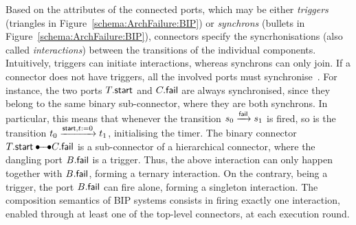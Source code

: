 \documentclass[smallcondensed]{svjour3}
\newcommand{\mdash}{---}
\newcommand{\goesto}[2][]{\ensuremath{\xrightarrow[#1]{#2}}}
\begin{document}
Based on the
attributes of the connected ports, which may be
either \emph{triggers} (triangles in Figure~\ref{schema:ArchFailure:BIP})
or \emph{synchrons} (bullets in Figure~\ref{schema:ArchFailure:BIP}),
%
connectors specify the syncrhonisations (also called
\emph{interactions}) between the transitions of the individual
components.  Intuitively, triggers can initiate interactions, whereas
synchrons can only join.  If a connector does not have triggers, all
the involved ports must synchronise~\cite{BliSif08-acp-tc}.
%
For instance, the two ports $T.\mathsf{start}$ and
$C.\mathsf{fail}$ are always synchronised, since they belong to
the same binary sub-connector, where they are both synchrons.  In
particular, this means that whenever the transition 
$\cstate{0} \goesto{\PortFail} \cstate{1}$ is fired, so is the transition
$\tstate{0} \goesto{\PortStart, t:=0} \tstate{1}$,
initialising the timer.  The binary connector $\NameTimer.\PortStart
\bullet\!\!\!-\!\!\!-\!\!\!\bullet \NameCtrl.\PortFail$ is a
sub-connector of a hierarchical connector, where the dangling port
$B.\mathsf{fail}$ is a trigger.  Thus, the above interaction can
only happen together with $B.\mathsf{fail}$, forming a
ternary interaction.  On the contrary, being a trigger, the port
$B.\mathsf{fail}$ can fire alone, forming a singleton
interaction.  The composition semantics of BIP systems consists in
firing exactly one interaction, enabled through at least one of the
top-level connectors, at each execution round.

\end{document}
